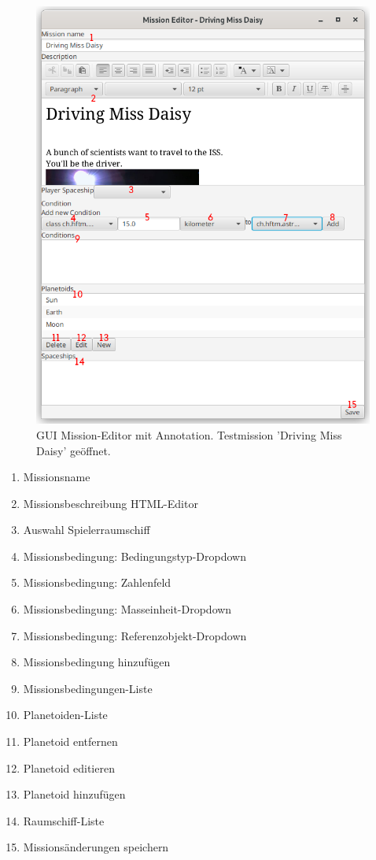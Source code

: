 \begin{figure}[H]
	\centering
	\includegraphics[width=12cm]{res/missioneditor.png}
	\caption{GUI Mission-Editor mit Annotation. Testmission 'Driving Miss Daisy' geöffnet.}
\end{figure}

\begin{enumerate}[noitemsep]
	\item Missionsname
	\item Missionsbeschreibung HTML-Editor
	\item Auswahl Spielerraumschiff
	\item Missionsbedingung: Bedingungstyp-Dropdown
	\item Missionsbedingung: Zahlenfeld
	\item Missionsbedingung: Masseinheit-Dropdown
	\item Missionsbedingung: Referenzobjekt-Dropdown
	\item Missionsbedingung hinzufügen
	\item Missionsbedingungen-Liste
	\item Planetoiden-Liste
	\item Planetoid entfernen
	\item Planetoid editieren
	\item Planetoid hinzufügen
	\item Raumschiff-Liste
	\item Missionsänderungen speichern
\end{enumerate}

